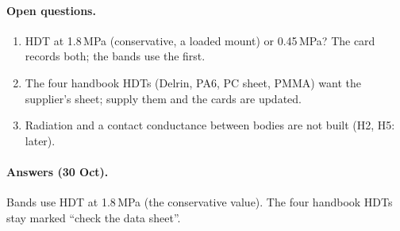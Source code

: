 \paragraph{Open questions.}
\begin{enumerate}[nosep]
  \item HDT at 1.8\,MPa (conservative, a loaded mount) or 0.45\,MPa? The card records both; the bands use the first.
  \item The four handbook HDTs (Delrin, PA6, PC sheet, PMMA) want the supplier's sheet; supply them and the cards are updated.
  \item Radiation and a contact conductance between bodies are not built (H2, H5: later).
\end{enumerate}

\paragraph{Answers (30 Oct).} Bands use HDT at 1.8\,MPa (the conservative value). The four handbook HDTs stay
marked ``check the data sheet''.
